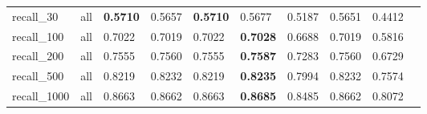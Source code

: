 \begin{table}[tbp]
\begin{tabular}{|l|l|l|l|l|l|l|l|l|l|}
        recall\_30 & all & \textbf{0.5710} & 0.5657 & \textbf{0.5710} & 0.5677 & 0.5187 & 0.5651 & 0.4412  \\ 
        recall\_100 & all & 0.7022 & 0.7019 & 0.7022 & \textbf{0.7028} & 0.6688 & 0.7019 & 0.5816  \\ 
        recall\_200 & all & 0.7555 & 0.7560 & 0.7555 & \textbf{0.7587} & 0.7283 & 0.7560 & 0.6729  \\ 
        recall\_500 & all & 0.8219 & 0.8232 & 0.8219 & \textbf{0.8235} & 0.7994 & 0.8232 & 0.7574  \\ 
        recall\_1000 & all & 0.8663 & 0.8662 & 0.8663 & \textbf{0.8685} & 0.8485 & 0.8662 & 0.8072  \\
	\bottomrule
    \end{tabular}
\end{table}


